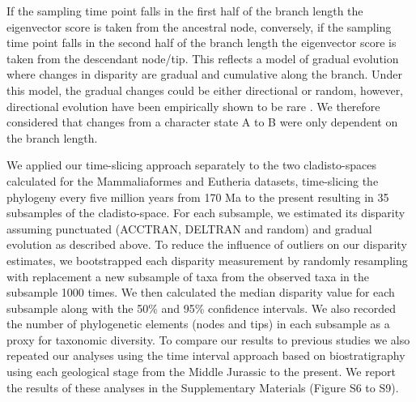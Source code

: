 \documentclass[12pt,letterpaper]{article}
\begin{document}
\begin{enumerate}
    If the sampling time point falls in the first half of the branch length the eigenvector score is taken from the ancestral node, conversely, if the sampling time point falls in the second half of the branch length the eigenvector score is taken from the descendant node/tip.
    This reflects a model of gradual evolution where changes in disparity are gradual and cumulative along the branch.
    Under this model, the gradual changes could be either directional or random, however, directional evolution have been empirically shown to be rare \citep[only 5\% of the time][]{Hunt20112007}.
    We therefore considered that changes from a character state A to B were only dependent on the branch length.
\end{enumerate}
We applied our time-slicing approach separately to the two cladisto-spaces calculated for the Mammaliaformes and Eutheria datasets, time-slicing the phylogeny every five million years from 170 Ma to the present resulting in 35 subsamples of the cladisto-space.
For each subsample, we estimated its disparity assuming punctuated (ACCTRAN, DELTRAN and random) and gradual evolution as described above.
To reduce the influence of outliers on our disparity estimates, we bootstrapped each disparity measurement by randomly resampling with replacement a new subsample of taxa from the observed taxa in the subsample 1000 times.
We then calculated the median disparity value for each subsample along with the 50\% and 95\% confidence intervals.
We also recorded the number of phylogenetic elements (nodes and tips) in each subsample as a proxy for taxonomic diversity.
To compare our results to previous studies we also repeated our analyses using the time interval approach based on biostratigraphy \citep[e.g.][]{cisneros2010,prentice2011,Hughes20082013,bentonmodels2014} using each geological stage from the Middle Jurassic to the present.
We report the results of these analyses in the Supplementary Materials (Figure S6 to S9).

\end{document}
